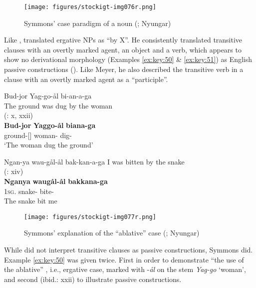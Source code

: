 \begin{figure}
\texttt{[image: figures/stockigt-img076r.png]}
\caption{Symmons' case paradigm of a noun (\citeyear[ix]{symmons_grammatical_1841}; Nyungar)}
\label{fig:key:130}
\end{figure}

Like \citet{meyer_vocabulary_1843}, \citet{symmons_grammatical_1841} translated ergative NPs as ``by X''. He consistently translated transitive clauses with an overtly marked agent, an object and a verb, which appears to show no derivational morphology (Examples \ref{ex:key:50} \& \ref{ex:key:51}) as English passive constructions (). Like Meyer, he also described the transitive verb in a clause with an overtly marked agent as a ``participle''.

\newpage
\ea \label{ex:key:50}
	Bud-jor Yag-go-ål   bi-an-a-ga \\
	\glt The ground was dug by the woman \\
	(\citealt{symmons_grammatical_1841}: x, xxii) \\
	\gll \textbf{Bud-jor}          \textbf{Yaggo-ål}      \textbf{biana-ga}\\
	ground-[]    woman-   dig-\\
	\glt `The woman dug the ground'
\z

\ea\label{ex:key:51}
	Ngan-ya   wau-gål-ål   bak-kan-a-ga
	\glt I was bitten by the snake \\
	(\citealt{symmons_grammatical_1841}: xiv) \\
	\gll \textbf{Nganya}   \textbf{waugål-ål}           \textbf{bakkana-ga}\\
	1\textsc{sg}.  snake-         bite-\\
	\glt The snake bit me
\z

\begin{figure}
\texttt{[image: figures/stockigt-img077r.png]}
\caption{Symmons' explanation of the “ablative” case (\citeyear[ix]{symmons_grammatical_1841}; Nyungar)}
\label{fig:key:131}
\end{figure}

While \citet{meyer_vocabulary_1843} did not interpret transitive clauses as passive constructions, Symmons did. Example \ref{ex:key:50} was given twice. First in order to demonstrate ``the use of the ablative'' \citep[x]{symmons_grammatical_1841}, i.e., ergative case, marked with -\textit{ål} on the stem \textit{Yag-go} `woman', and second (ibid.: xxii) to illustrate passive constructions.

